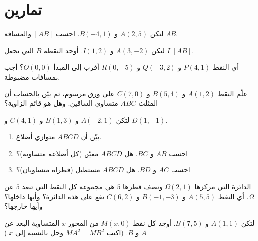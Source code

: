 \section{تمارين}

\begin{exercise}[$\star$]\label{exo:g10:coordgeom:1}
لتكن $A(2, 5)$ و $B(-4, 1)$. احسب  
$[AB]$ والمسافة $AB$.
\end{exercise}

\begin{exercise}[$\star$]\label{exo:g10:coordgeom:2}
لتكن $A(3, -2)$ و $I(1, 2)$. أوجد  النقطة $B$ التي
تجعل $I$  $[AB]$.
\end{exercise}

\begin{exercise}[$\star$]\label{exo:g10:coordgeom:3}
أي النقط $P(4, 1)$ و $Q(-3, 2)$ و $R(0, -5)$ أقرب إلى
المبدأ $O(0,0)$؟ أجب بمسافات مضبوطة.
\end{exercise}

\begin{exercise}[$\star$]\label{exo:g10:coordgeom:4}
علّم النقط $A(1, 2)$ و $B(5, 4)$ و $C(7, 0)$ على ورق مرسوم، ثم بيّن
بالحساب أن المثلث $ABC$ متساوي الساقين. وهل هو قائم الزاوية؟
\end{exercise}

\begin{exercise}[$\star\star$]\label{exo:g10:coordgeom:5}
لتكن $A(-2, 1)$ و $B(1, 3)$ و $C(4, 1)$ و $D(1, -1)$.
\begin{enumerate}
  \item بيّن أن $ABCD$ متوازي أضلاع.
  \item احسب $AB$ و $BC$. هل $ABCD$ معيّن (كل أضلاعه متساوية)؟
  \item احسب $AC$ و $BD$. هل $ABCD$ مستطيل (قطراه متساويان)؟
\end{enumerate}
\end{exercise}

\begin{exercise}[$\star\star$]\label{exo:g10:coordgeom:6}
الدائرة التي مركزها $\Omega(2, 1)$ ونصف قطرها $5$ هي مجموعة كل
النقط التي تبعد $5$ عن $\Omega$. أي النقط $A(5, 5)$ و
$B(-1, -3)$ و $C(6, 2)$ تقع على هذه الدائرة؟ وأيها داخلها؟ وأيها خارجها؟
\end{exercise}

\begin{exercise}[$\star\star$]\label{exo:g10:coordgeom:7}
لتكن $A(1, 1)$ و $B(7, 5)$. أوجد كل نقط $M(x, 0)$ من المحور $x$
المتساوية البعد عن $A$ و $B$. (اكتب $MA^2 = MB^2$ وحل بالنسبة إلى
$x$.)
\end{exercise}

